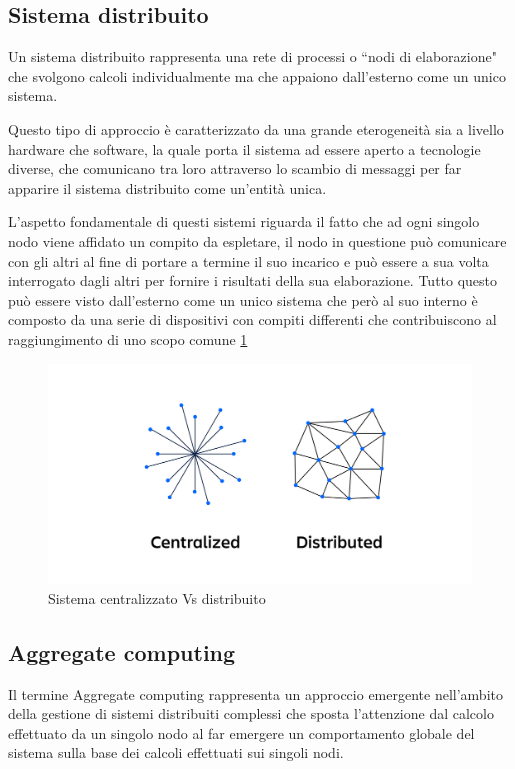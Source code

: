 \documentclass[12pt,a4paper,openright,twoside]{book}
\begin{document}
\subsection{Sistema distribuito}
Un sistema distribuito rappresenta una rete di processi o ``nodi di elaborazione" che svolgono calcoli individualmente ma che appaiono dall'esterno come un unico sistema.

Questo tipo di approccio è caratterizzato da una grande eterogeneità sia a livello hardware che software, la quale porta il sistema ad essere aperto a tecnologie diverse, che comunicano tra loro attraverso lo scambio di messaggi per far apparire il sistema distribuito come un'entità unica.

L'aspetto fondamentale di questi sistemi riguarda il fatto che ad ogni singolo \gls{nodo} viene affidato un compito da espletare, il nodo in questione può comunicare con gli altri al fine di portare a termine il suo incarico e può essere a sua volta interrogato dagli altri per fornire i risultati della sua elaborazione.
Tutto questo può essere visto dall'esterno come un unico sistema che però al suo interno è composto da una serie di dispositivi con compiti differenti che contribuiscono al raggiungimento di uno scopo comune \ref{fig:centralizedVsDistributed}
\begin{figure}[h!]
	\centering
	\includegraphics[width=0.8\linewidth]{figures/centralizedVsDistributed.png}
	\caption{Sistema centralizzato Vs distribuito \cite{centralizedVsDistributed}}
	\label{fig:centralizedVsDistributed}
\end{figure}

\subsection{Aggregate computing}
Il termine Aggregate computing rappresenta un approccio emergente nell'ambito della gestione di sistemi distribuiti complessi \cite{VIROLI2019100486} che sposta l'attenzione dal calcolo effettuato da un singolo nodo al far emergere un comportamento globale del sistema sulla base dei calcoli effettuati sui singoli nodi.
\end{document}
